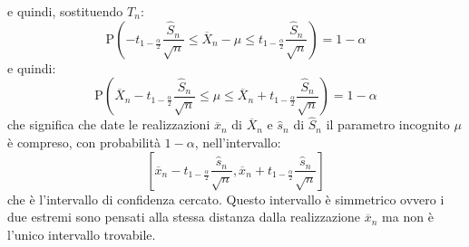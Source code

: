 \documentclass[a4paper,12pt, oneside]{book}
\begin{document}
\begin{enumerate}
  e quindi, sostituendo $T_n$:
  \[\mathrm{P}\left(-t_{1- \frac{\alpha}{2}} \frac{\hat{S}_{n}}{\sqrt{n}} \leq \overline{X}_{n}-\mu \leq t_{1-\frac{\alpha}{2}} \frac{\hat{S}_{n}}{\sqrt{n}}\right)=1-\alpha\]
  e quindi:
  \[\mathrm{P}\left(\overline{X}_{n}-t_{\mathrm{1}-\frac{\alpha}{2}} \frac{\hat{S}_{n}}{\sqrt{n}} \leq \mu \leq \overline{X}_{n}+t_{\mathrm{1} -\frac{\alpha}{2}} \frac{\hat{S}_{n}}{\sqrt{n}}\right)=1-\alpha\]
  che significa che date le realizzazioni $\overline{x}_n$ di $\overline{X}_n$ e $\hat{s}_n$ di $\hat{S}_n$
  il parametro incognito $\mu$ è compreso, con probabilità $1-\alpha$, nell'intervallo:
  \[\left[\overline{x}_{n}-t_{1 -\frac{\alpha}{2}} \frac{\hat{s}_{n}}{\sqrt{n}}, \overline{x}_{n}+t_{1-\frac{\alpha}{2}} \frac{\hat{s}_{n}}{\sqrt{n}}\right]\]
  che è l'intervallo di confidenza cercato.
  Questo intervallo è simmetrico ovvero i due estremi sono pensati alla stessa
  distanza dalla realizzazione $\overline{x}_n$ ma non è l'unico intervallo trovabile.
  \end{enumerate}
\end{document}
